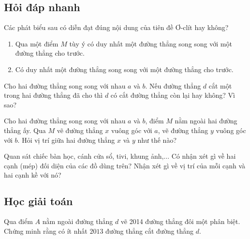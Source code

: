 \subsection{Hỏi đáp nhanh}
\begin{ex}[7H1B5]
	Các phát biểu sau có diễn đạt đúng nội dung của tiên đề Ơ-clít hay không?
	\begin{enumerate}
		\item Qua một điểm $M$ tùy ý có duy nhất một đường thẳng song song với một đường thẳng cho trước.
		\item Có duy nhất một đường thẳng song song với một đường thẳng cho trước.
	\end{enumerate}
\end{ex}
\begin{ex}[7H1B6]
	Cho hai đường thẳng song song với nhau $a$ và $b$. Nếu đường thẳng $d$ cắt  một trong hai đường thẳng đã cho thì $d$ có cắt đường thẳng còn lại hay không? Vì sao?
\end{ex}

\begin{ex}[7H1K6]
	Cho hai đường thẳng song song với nhau $a$ và $b$, điểm $M$ nằm ngoài hai đường thẳng ấy. Qua $M$ vẽ đường thẳng $x$ vuông góc với $a$, vẽ đường thẳng $y$ vuông góc với $b$. Hỏi vị trí giữa hai đường thẳng $x$ và $y$ như thế nào?
	\end{ex}
\begin{ex}[7H1B6]
	Quan sát chiếc bàn học, cánh cửa sổ, tivi, khung ảnh,... Có nhận xét gì về hai cạnh (mép) đối diện của các đồ dùng trên? Nhận xét gì về vị trí của mỗi cạnh và hai cạnh kề với nó?
	\end{ex}
\subsection{Học giải toán}
\begin{vd}[7H1B5]
	Qua điểm $A$ nằm ngoài đường thẳng $d$ vẽ 2014 đường thẳng đôi một phân biệt. Chứng minh rằng có ít nhất $2013$ đường thẳng cắt đường thẳng $d$.
\end{vd}

